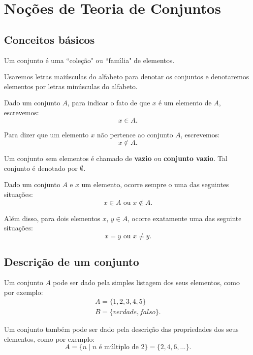 \chapter{No{\c c}{\~o}es de Teoria de Conjuntos}
\section{Conceitos b{\'a}sicos}

Um conjunto {\'e} uma ``cole{\c c}{\~a}o" ou ``fam{\'\i}lia" de elementos.

Usaremos letras mai{\'u}sculas do alfabeto para denotar os conjuntos e denotaremos elementos por letras min{\'u}sculas do alfabeto.

Dado um conjunto $A$, para indicar o fato de que $x$ {\'e} um elemento de $A$, escrevemos:
\[
x \in A.
\]

Para dizer que um elemento $x$ n{\~a}o pertence ao conjunto $A$, escrevemos:
\[
x \notin A.
\]

Um conjunto sem elementos {\'e} chamado de \textbf{vazio} ou \textbf{conjunto vazio}. Tal conjunto {\'e} denotado por $\emptyset$.

Dado um conjunto $A$ e $x$ um elemento, ocorre sempre o uma das seguintes situações:
\[
x \in A \mbox{ ou } x \notin A.
\]

Al{\'e}m disso, para dois elementos $x$, $y \in A$, ocorre exatamente uma das seguinte situações:
\[
x = y \mbox{ ou } x \neq y.
\]

\section{Descri{\c c}{\~a}o de um conjunto}

Um conjunto $A$ pode ser dado pela simples listagem dos seus elementos, como por exemplo:
\begin{align*}
	A= \{1,2,3,4,5\}\\
	B = \{verdade, falso\}.
\end{align*}

Um conjunto tamb{\'e}m pode ser dado pela descri{\c c}{\~a}o das propriedades dos seus elementos, como por exemplo:
\[
A = \{n \mid n \mbox{ \'e m{\'u}ltiplo de } 2\} = \{2,4,6,...\}.
\]

